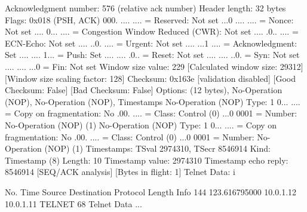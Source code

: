     Acknowledgment number: 576    (relative ack number)
    Header length: 32 bytes
    Flags: 0x018 (PSH, ACK)
        000. .... .... = Reserved: Not set
        ...0 .... .... = Nonce: Not set
        .... 0... .... = Congestion Window Reduced (CWR): Not set
        .... .0.. .... = ECN-Echo: Not set
        .... ..0. .... = Urgent: Not set
        .... ...1 .... = Acknowledgment: Set
        .... .... 1... = Push: Set
        .... .... .0.. = Reset: Not set
        .... .... ..0. = Syn: Not set
        .... .... ...0 = Fin: Not set
    Window size value: 229
    [Calculated window size: 29312]
    [Window size scaling factor: 128]
    Checksum: 0x163e [validation disabled]
        [Good Checksum: False]
        [Bad Checksum: False]
    Options: (12 bytes), No-Operation (NOP), No-Operation (NOP), Timestamps
        No-Operation (NOP)
            Type: 1
                0... .... = Copy on fragmentation: No
                .00. .... = Class: Control (0)
                ...0 0001 = Number: No-Operation (NOP) (1)
        No-Operation (NOP)
            Type: 1
                0... .... = Copy on fragmentation: No
                .00. .... = Class: Control (0)
                ...0 0001 = Number: No-Operation (NOP) (1)
        Timestamps: TSval 2974310, TSecr 8546914
            Kind: Timestamp (8)
            Length: 10
            Timestamp value: 2974310
            Timestamp echo reply: 8546914
    [SEQ/ACK analysis]
        [Bytes in flight: 1]
Telnet
    Data: i

No.     Time           Source                Destination           Protocol Length Info
    144 123.616795000  10.0.1.12             10.0.1.11             TELNET   68     Telnet Data ...

